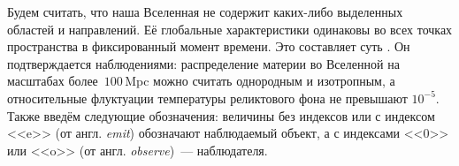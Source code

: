 Будем считать, что наша Вселенная не содержит каких-либо выделенных областей
 и направлений. Её глобальные характеристики одинаковы во всех точках
 пространства в фиксированный момент времени. Это составляет суть
 . Он подтверждается наблюдениями: распределение
 материи во Вселенной на масштабах более~$100$\,Mpc можно считать однородным
 и изотропным, а относительные флуктуации температуры реликтового фона не
 превышают $ 10^{-5}$. Также введём следующие обозначения: величины без индексов 
 или с индексом <<e>> (от англ. \textit{emit}) обозначают наблюдаемый объект, а с 
 индексами <<$0$>> или <<o>> (от англ. \textit{observe})~--- наблюдателя.